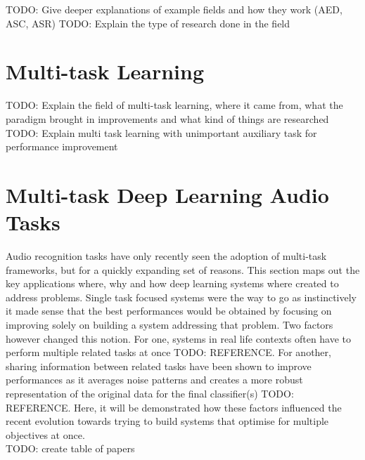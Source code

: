 TODO: Give deeper explanations of example fields and how they work (AED, ASC, ASR)
TODO: Explain the type of research done in the field

\section{Multi-task Learning}
TODO: Explain the field of multi-task learning, where it came from, what the paradigm brought in improvements and what kind of things are researched
TODO: Explain multi task learning with unimportant auxiliary task for performance improvement

\section{Multi-task Deep Learning Audio Tasks}

Audio recognition tasks have only recently seen the adoption of multi-task frameworks, but for a quickly expanding set of reasons. This section maps out the key applications where, why and how deep learning systems where created to address problems. Single task focused systems were the way to go as instinctively it made sense that the best performances would be obtained by focusing on improving solely on building a system addressing that problem. Two factors however changed this notion. For one, systems in real life contexts often have to perform multiple related tasks at once TODO: REFERENCE. For another, sharing information between related tasks have been shown to improve performances as it averages noise patterns and creates a more robust representation of the original data for the final classifier(s) TODO: REFERENCE. Here, it will be demonstrated how these factors influenced the recent evolution towards trying to build systems that optimise for multiple objectives at once.\\

TODO: create table of papers


